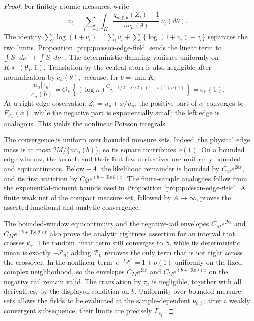 \begin{proof}
For finitely atomic measures, write
\[
 v_i=\sum_{\xi=\pm1}\int_K
       \frac{q_{n,\xi,\theta}(Z_i)-1}{nc_n(\theta)}
       \,\nu_\xi(d\theta).
\]
The identity
\(\sum_i\log(1+v_i)=\sum_iv_i+
\sum_i\{\log(1+v_i)-v_i\}\) separates the two limits. Proposition
\ref{prop:poisson-edge-field} sends the linear term to
\(\int S_+d\nu_++\int S_-d\nu_-\). The deterministic damping vanishes
uniformly on \(K\Subset(\theta_\alpha,1)\). Translation by the central atom
is also negligible after normalization by \(c_n(\theta)\), because, for
\(b=\min K\),
\[
    \frac{u_n|\tau_n|}{c_n(b)}
    =O_{\mathbb P}\!\left\{(\log n)^C
      n^{-1/2+\alpha/2+(1-b)^2+o(1)}\right\}
    =o_{\mathbb P}(1).
\]
At a right-edge observation \(Z_i=u_n+x/u_n\), the positive part of \(v_i\)
converges to \(F_{\nu_+}(x)\), while the negative part is exponentially small;
the left edge is analogous. This yields the nonlinear Poisson integrals.

The convergence is uniform over bounded measure sets. Indeed, the physical
edge mass is at most \(2M/\{nc_n(b)\}\), so its square contributes \(o(1)\).
On a bounded edge window, the kernels and their first few derivatives are
uniformly bounded and equicontinuous. Below \(-A\), the likelihood remainder
is bounded by \(C_Me^{2bx}\), and its first variation by
\(C_Me^{(b+\operatorname{Re}\theta)x}\). The finite-sample analogues follow
from the exponential-moment bounds used in Proposition
\ref{prop:poisson-edge-field}. A finite weak net of the compact measure set,
followed by \(A\to\infty\), proves the asserted functional and analytic
convergence.

The bounded-window equicontinuity and the negative-tail envelopes
\(C_Me^{2bx}\) and \(C_Me^{(b+\operatorname{Re}\theta)x}\) also prove the
analytic tightness assertion for an interval that crosses
\(\theta_\alpha\). The random linear term still
converges to \(S\), while its deterministic mean is exactly
\(-\mathcal P_n\); adding \(\mathcal P_n\) removes the only term that is not
tight across the crossover. In the nonlinear term,
\(e^{-\lambda_n\theta^2}=1+o(1)\) uniformly on the fixed complex
neighborhood, so the envelopes \(C_Me^{2bx}\) and
\(C_Me^{(b+\operatorname{Re}\theta)x}\) on the negative tail remain valid. The
translation by \(\tau_n\) is negligible, together with all derivatives, by
the displayed condition on \(b\). Uniformity over bounded measure sets allows
the fields to be evaluated at the sample-dependent \(\nu_{n,\xi}\); after a
weakly convergent subsequence, their limits are precisely
\(\Gamma_{\nu_\xi}\).


\end{proof}
